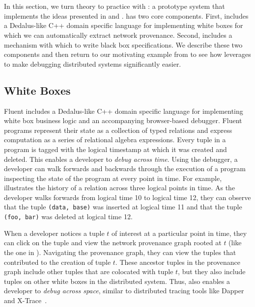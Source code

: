 \section{\fluent{}}
In this section, we turn theory to practice with \fluent{}: a prototype system
that implements the ideas presented in  and
. \fluent{} has two core components. First, \fluent{}
includes a Dedalus-like C++ domain specific language for implementing white
boxes for which we can automatically extract network provenance. Second,
\fluent{} includes a mechanism with which to write black box \watprovenance{}
specifications. We describe these two components and then return to our
motivating example from  to see how \fluent{}
leverages \watprovenance{} to make debugging distributed systems significantly
easier.

\subsection{White Boxes}
Fluent includes a Dedalus-like C++ domain specific language for implementing
white box business logic and an accompanying browser-based debugger. Fluent
programs represent their state as a collection of typed relations and express
computation as a series of relational algebra expressions. Every tuple in a
\fluent{} program is tagged with the logical timestamp at which it was created
and deleted. This enables a developer to \emph{debug across time}. Using the
debugger, a developer can walk forwards and backwards through the execution of
a \fluent{} program inspecting the state of the program at every point in time.
%
For example,  illustrates the history of a relation
across three logical points in time. As the developer walks forwards from
logical time 10 to logical time 12, they can observe that the tuple
\texttt{(data, base)} was inserted at logical time 11 and that the tuple
\texttt{(foo, bar)} was deleted at logical time 12.

{}

When a developer notices a tuple $t$ of interest at a particular point in time,
they can click on the tuple and view the network provenance graph rooted at $t$
(like the one in ). Navigating the provenance
graph, they can view the tuples that contributed to the creation of tuple $t$.
These ancestor tuples in the provenance graph include other tuples that are
colocated with tuple $t$, but they also include tuples on other \fluent{} white
boxes in the distributed system. Thus, \fluent{} also enables a developer to
\emph{debug across space}, similar to distributed tracing tools
like Dapper~\cite{sigelman2010dapper} and X-Trace~\cite{fonseca2007x}.

